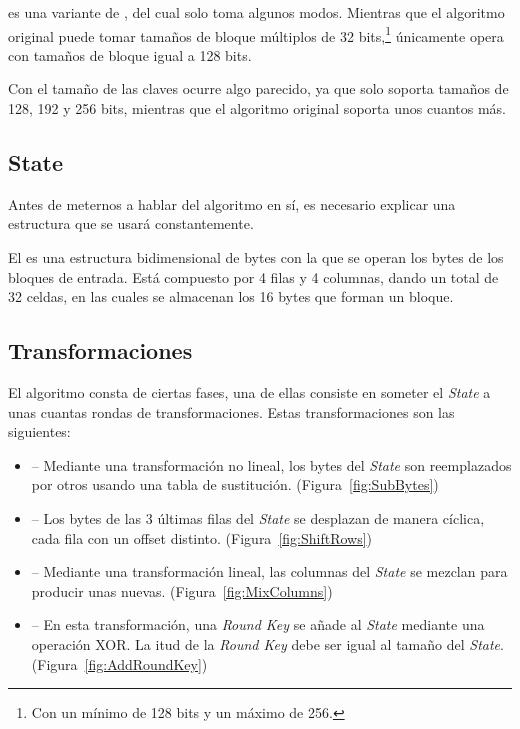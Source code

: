   es una variante de , del cual solo toma algunos modos.
 Mientras que el algoritmo original puede tomar tamaños de bloque múltiplos de 32 bits,\footnote{Con un mínimo de 128 bits y un máximo de 256.}
  únicamente opera con tamaños de bloque igual a 128 bits.

 Con el tamaño de las claves ocurre algo parecido, ya que  solo soporta tamaños de 128, 192 y 256 bits,
 mientras que el algoritmo original soporta unos cuantos más. \emph{\parencite{Reference25}}

 \subsection{State}

 Antes de meternos a hablar del algoritmo en sí, es necesario explicar una estructura que se usará
 constantemente.

 El  es una estructura bidimensional de bytes con la que se operan los bytes
 de los bloques de entrada. Está compuesto por 4 filas y 4 columnas, dando un total de 32 celdas,
 en las cuales se almacenan los 16 bytes que forman un bloque. \emph{\parencite{Reference26}}

 \subsection{Transformaciones}

 El algoritmo consta de ciertas fases, una de ellas consiste en someter el \emph{State}
 a unas cuantas rondas de transformaciones. Estas transformaciones son las siguientes:

 \begin{itemize}
 \item {} -- Mediante una transformación no lineal,
 los bytes del \emph{State} son reemplazados por otros usando una tabla de sustitución.
 (Figura~\ref{fig:SubBytes})

 \item {} -- Los bytes de las 3 últimas filas del \emph{State}
 se desplazan de manera cíclica, cada fila con un offset distinto.
 (Figura~\ref{fig:ShiftRows})

 \item {} -- Mediante una transformación lineal,
 las columnas del \emph{State} se mezclan para producir unas nuevas.
 (Figura~\ref{fig:MixColumns})

 \item {} -- En esta transformación, una \emph{Round Key} se
 añade al \emph{State} mediante una operación XOR.
 La itud de la \emph{Round Key} debe ser igual al tamaño del \emph{State}.
 (Figura~\ref{fig:AddRoundKey})

 \end{itemize}

